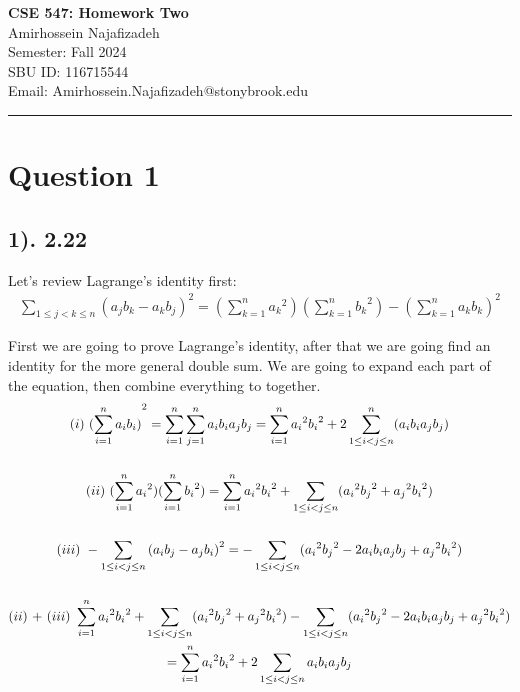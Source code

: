 \documentclass[12pt]{article}
\newcommand{\RNum}[1]{\uppercase\expandafter{\romannumeral #1\relax}}
\begin{document}
\begin{center}
    {\LARGE\textbf{CSE 547: Homework Two}} \\[1em]
    {\large Amirhossein Najafizadeh} \\[1em]
    Semester: Fall 2024 \\ 
    SBU ID: 116715544 \\
    Email: Amirhossein.Najafizadeh@stonybrook.edu \\[1em]
    \noindent\rule{\textwidth}{0.6pt}
\end{center}

\section*{Question 1}
\subsection*{1). 2.22}
Let's review Lagrange's identity first:
\begin{gather*}
    \sum_{1 \leq j < k \leq n} {(a_{j}b_{k} - a_{k}b_{j})}^2 = (\sum_{k=1}^n {a_{k}}^2)(\sum_{k=1}^n {b_{k}}^2) - {(\sum_{k=1}^n a_{k}b_{k})}^2
\end{gather*}

First we are going to prove Lagrange's identity, after that we are going find an identity
for the more general double sum. We are going to expand each part of the equation, then combine
everything to together.
\begin{gather*}
    \text{($\RNum{1}$) } {(\sum_{i=1}^n a_{i}b_{i})}^2 = \sum_{i=1}^n \sum_{j=1}^n a_{i}b_{i}a_{j}b_{j} = \sum_{i=1}^n {a_{i}}^2 {b_{i}}^2 + 2 \sum_{1 \leq i < j \leq n}^n (a_{i}b_{i}a_{j}b_{j}) \\
    \\
    \text{($\RNum{2}$) } (\sum_{i=1}^n {a_{i}}^2)(\sum_{i=1}^n {b_{i}}^2) = \sum_{i=1}^n {a_{i}}^2 {b_{i}}^2 + \sum_{1 \leq i < j \leq n} ({a_{i}}^2 {b_{j}}^2 + {a_{j}}^2 {b_{i}}^2) \\
    \\
    \text{($\RNum{3}$) } - \sum_{1 \leq i < j \leq n} {(a_{i}b_{j} - a_{j}b_{i})}^2 = - \sum_{1 \leq i < j \leq n} ({a_{i}}^2 {b_{j}}^2 - 2a_{i}b_{i}a_{j}b_{j} + {a_{j}}^2 {b_{i}}^2) \\
    \\
    \text{($\RNum{2}$) + ($\RNum{3}$) } \sum_{i=1}^n {a_{i}}^2 {b_{i}}^2 + \sum_{1 \leq i < j \leq n} ({a_{i}}^2 {b_{j}}^2 + {a_{j}}^2 {b_{i}}^2) - \sum_{1 \leq i < j \leq n} ({a_{i}}^2 {b_{j}}^2 - 2a_{i}b_{i}a_{j}b_{j} + {a_{j}}^2 {b_{i}}^2) \\
    = \sum_{i=1}^n {a_{i}}^2 {b_{i}}^2 + 2 \sum_{1 \leq i < j \leq n} a_{i}b_{i}a_{j}b_{j}
\end{gather*}
\end{document}
